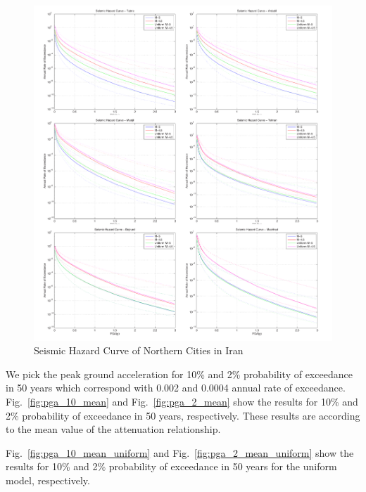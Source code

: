 \begin{figure} [!ht]
\centering
\includegraphics[scale=0.4]{figures/pdf/HazardCurve.pdf} 
\caption{Seismic Hazard Curve of Northern Cities in Iran}
\label{fig:hazardcurve}
\end{figure}


We pick the peak ground acceleration for 10\% and 2\% probability of exceedance in 50 years which correspond with 0.002 and 0.0004 annual rate of exceedance. Fig.~\ref{fig:pga_10_mean} and Fig.~\ref{fig:pga_2_mean} show the results for 10\% and 2\% probability of exceedance in 50 years, respectively. These results are according to the mean value of the attenuation relationship.

Fig.~\ref{fig:pga_10_mean_uniform} and Fig.~\ref{fig:pga_2_mean_uniform} show the results for 10\% and 2\% probability of exceedance in 50 years for the uniform model, respectively.


